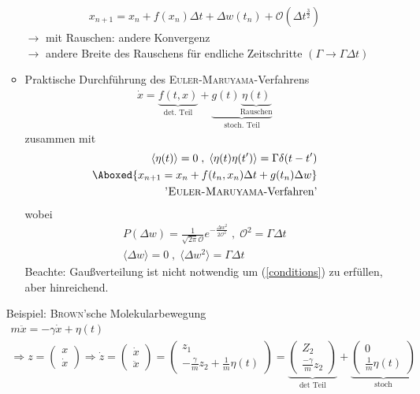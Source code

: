 \documentclass[12pt]{article}
\begin{document}
\begin{enumerate}
\begin{itemize}
\begin{align}
{ x_{n+1} = x_n + f(x_n) \Delta t + \Delta w (t_n) + \mathcal{O} (\Delta t^\frac{3}{2})}
\end{align}
$\to$ mit Rauschen: andere Konvergenz \\
$\to$ andere Breite des Rauschens für endliche Zeitschritte $(\Gamma \to \Gamma \Delta t)$
\item Praktische Durchführung des \textsc{Euler-Maruyama}-Verfahrens
\begin{align}
\dot{x}= \underbrace{ f(t,x)}_\text{det. Teil} +\underbrace{ g(t) \underbrace{\eta (t)}_\text{Rauschen}}_\text{stoch. Teil}
\end{align}
zusammen mit
\begin{align}
\langle \eta (t) \rangle = 0 \; , \; \langle \eta (t) \eta (t') \rangle = \Gamma \delta (t-t')  \label{conditions}\\
\Aboxed{ x_{n+1}= x_n + f(t_n, x_n) \Delta t + g (t_n) \Delta w}\\ 
\mbox{ \textsc{'Euler-Maruyama}-Verfahren'}
\end{align}
wobei 
\begin{align}
P( \Delta w) = \frac{1}{\sqrt{2 \pi} \mathcal{O}} e^{-\frac{\Delta w^2}{	2 \mathcal{O}^2}} \; , \; \mathcal{O}^2 = \Gamma \Delta t \\
\langle \Delta w \rangle = 0 \; , \; \langle \Delta w^2 \rangle = \Gamma \Delta t
\end{align}
Beachte: Gaußverteilung ist nicht notwendig um (\ref{conditions}) zu erfüllen, aber hinreichend.
\end{itemize}
Beispiel: \textsc{Brown}'sche Molekularbewegung 
\begin{align*}
m \ddot{x}= - \gamma \dot{x} + \eta (t) \\
\Rightarrow z= 
\begin{pmatrix}x\\ \dot{x}\end{pmatrix} 
\Rightarrow  \dot{z} = \begin{pmatrix} \dot{x}\\ \ddot{x}\end{pmatrix} = \begin{pmatrix}z_1\\ - \frac{\gamma}{m} z_2 + \frac{1}{m} \eta (t)\end{pmatrix} = 
\underbrace{\begin{pmatrix} Z_2 \\ \frac{-\gamma}{m} z_2 \end{pmatrix} }_\text{det Teil}+\underbrace{ \begin{pmatrix} 0\\ \frac{1}{m} \eta (t)\end{pmatrix} }_\text{stoch}

\end{align*}
\end{enumerate}
\end{document}
